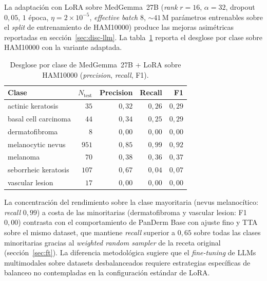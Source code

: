 La adaptación con LoRA sobre MedGemma~27B
(\emph{rank} $r = 16$, $\alpha = 32$, dropout $0{,}05$,
$1$ época, $\eta = 2\times 10^{-5}$, \emph{effective batch}
$8$, $\sim 41$\,M parámetros entrenables sobre el
\emph{split} de entrenamiento de HAM10000) produce las mejoras
asimétricas reportadas en sección~\ref{sec:disc-llm}. La
tabla~\ref{tab:anexoh-medgemma-perclass} reporta el desglose por
clase sobre HAM10000 con la variante adaptada.

\begin{table}[H]
\centering
\footnotesize
\setlength{\tabcolsep}{4pt}
\renewcommand{\arraystretch}{0.95}
\caption{Desglose por clase de MedGemma~27B + LoRA sobre HAM10000
(\emph{precision}, \emph{recall}, F1).}
\label{tab:anexoh-medgemma-perclass}
\begin{tabular}{lrrrr}
\hline
Clase                       & $N_{\mathrm{test}}$ & Precision & Recall    & F1 \\
\hline
actinic keratosis           & $35$    & $0{,}32$  & $0{,}26$  & $0{,}29$ \\
basal cell carcinoma        & $44$    & $0{,}34$  & $0{,}25$  & $0{,}29$ \\
dermatofibroma              & $8$     & $0{,}00$  & $0{,}00$  & $0{,}00$ \\
melanocytic nevus           & $951$   & $0{,}85$  & $0{,}99$  & $0{,}92$ \\
melanoma                    & $70$    & $0{,}38$  & $0{,}36$  & $0{,}37$ \\
seborrheic keratosis        & $107$   & $0{,}67$  & $0{,}04$  & $0{,}07$ \\
vascular lesion             & $17$    & $0{,}00$  & $0{,}00$  & $0{,}00$ \\
\hline
\end{tabular}
\end{table}

La concentración del rendimiento sobre la clase mayoritaria
(nevus melanocítico: \emph{recall} $0{,}99$) a costa de las
minoritarias (dermatofibroma y vascular lesion: F1 $0{,}00$)
contrasta con el comportamiento de PanDerm Base con ajuste fino y TTA
sobre el mismo dataset, que mantiene \emph{recall} superior a
$0{,}65$ sobre todas las clases minoritarias gracias al
\emph{weighted random sampler} de la receta original
(sección~\ref{sec:ft}). La diferencia metodológica sugiere que el
\emph{fine-tuning} de LLMs multimodales sobre datasets
desbalanceados requiere estrategias específicas de balanceo no
contempladas en la configuración estándar de LoRA.

